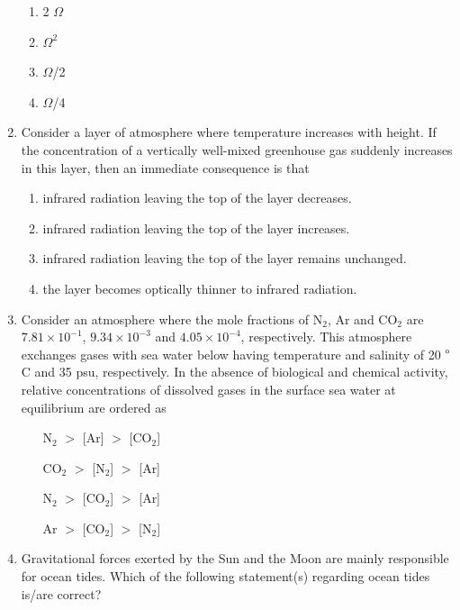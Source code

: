 \documentclass[a4paper,10pt]{article}
\begin{document}
\begin{enumerate}
\hfill{}
\begin{enumerate}
    \item 2 $\Omega$
    \item $\Omega^2$
    \item $\Omega$/2
    \item $\Omega$/4
\end{enumerate}

\item Consider a layer of atmosphere where temperature increases with height. If the concentration of a vertically well-mixed greenhouse gas suddenly increases in this layer, then an immediate consequence is that

\hfill{}
\begin{enumerate}
    \item infrared radiation leaving the top of the layer decreases.
    \item infrared radiation leaving the top of the layer increases.
    \item infrared radiation leaving the top of the layer remains unchanged.
    \item the layer becomes optically thinner to infrared radiation.
\end{enumerate}

\item Consider an atmosphere where the mole fractions of N$_2$, Ar and CO$_2$ are $7.81 \times 10^{-1}$, $9.34 \times 10^{-3}$ and $4.05 \times 10^{-4}$, respectively. This atmosphere exchanges gases with sea water below having temperature and salinity of 20 $\degree$C and 35 psu, respectively. In the absence of biological and chemical activity, relative concentrations of dissolved gases in the surface sea water at equilibrium are ordered as

\hfill{}
\begin{enumerate}
    \item [N$_2$] $>$ [Ar] $>$ [CO$_2$]
    \item [CO$_2$] $>$ [N$_2$] $>$ [Ar]
    \item [N$_2$] $>$ [CO$_2$] $>$ [Ar]
    \item [Ar] $>$ [CO$_2$] $>$ [N$_2$]
\end{enumerate}

\item Gravitational forces exerted by the Sun and the Moon are mainly responsible for ocean tides. Which of the following statement(s) regarding ocean tides is/are correct?


\end{enumerate}
\end{document}
